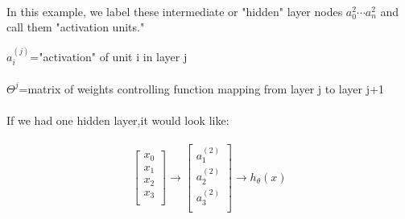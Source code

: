\documentclass[UTF8]{ctexart}
\begin{document}
\paragraph{}
In this example, we label these intermediate or "hidden" layer nodes $a_{0}^{2} \cdots a_{n}^{2}$ and call them "activation units."
\begin{algorithm}
$a_{i}^{(j)}$="activation" of unit i in layer j
\paragraph{}
$\Theta^{j}$=matrix of weights controlling function mapping from layer j to layer j+1
\paragraph{}
If we had one hidden layer,it would look like:
\end{algorithm}
\paragraph{}
\begin{algorithm}
\begin{equation}
\left[\begin{array}{l}
x_{0}\\
x_{1}\\
x_{2}\\
x_{3}\\
\end{array}\right]\rightarrow\left[\begin{array}{l}
a_{1}^{(2)}\\
a_{2}^{(2)}\\
a_{3}^{(2)}\\
\end{array}\right]\rightarrow
h_{\theta}(x)
\end{equation}
\end{algorithm}
\end{document}
